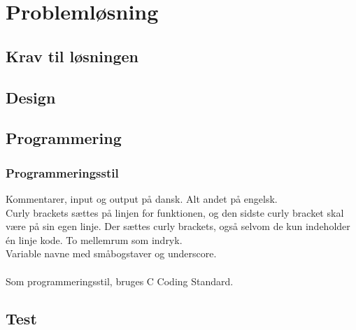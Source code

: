 \chapter{Problemløsning}\label{ch:chlabel}

\section{Krav til løsningen}

\section{Design}


\section{Programmering}

\subsection*{Programmeringsstil}
Kommentarer, input og output på dansk. Alt andet på engelsk.\\
Curly brackets sættes på linjen for funktionen, og den sidste curly bracket skal være på sin egen linje. Der sættes curly brackets, også selvom de kun indeholder én linje kode. To mellemrum som indryk.\\
Variable navne med småbogstaver og underscore.
\\\\
Som programmeringsstil, bruges C Coding Standard\cite{codingstyle}.



\section{Test}






